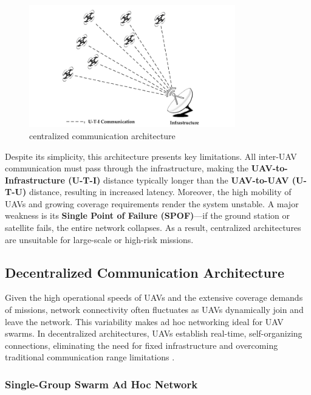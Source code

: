 \begin{figure}[H]
\centering
\includegraphics[width=0.8\textwidth]{Figures/Chapter1/Section5/1.png}
\caption{centralized communication architecture \cite{Chen2020}}
\label{fig:centralized communication architecture}
\end{figure}

Despite its simplicity, this architecture presents key limitations. All inter-UAV communication must pass through the infrastructure, making the \textbf{UAV-to-Infrastructure (U-T-I)} distance typically longer than the \textbf{UAV-to-UAV (U-T-U)} distance, resulting in increased latency. Moreover, the high mobility of UAVs and growing coverage requirements render the system unstable. A major weakness is its \textbf{Single Point of Failure (SPOF)}—if the ground station or satellite fails, the entire network collapses. As a result, centralized architectures are unsuitable for large-scale or high-risk missions.





\subsection{Decentralized Communication Architecture}

Given the high operational speeds of UAVs and the extensive coverage demands of missions, network connectivity often fluctuates as UAVs dynamically join and leave the network. This variability makes ad hoc networking ideal for UAV swarms. In decentralized architectures, UAVs establish real-time, self-organizing connections, eliminating the need for fixed infrastructure and overcoming traditional communication range limitations \cite{Chen2020}.



\subsubsection{Single-Group Swarm Ad Hoc Network}

